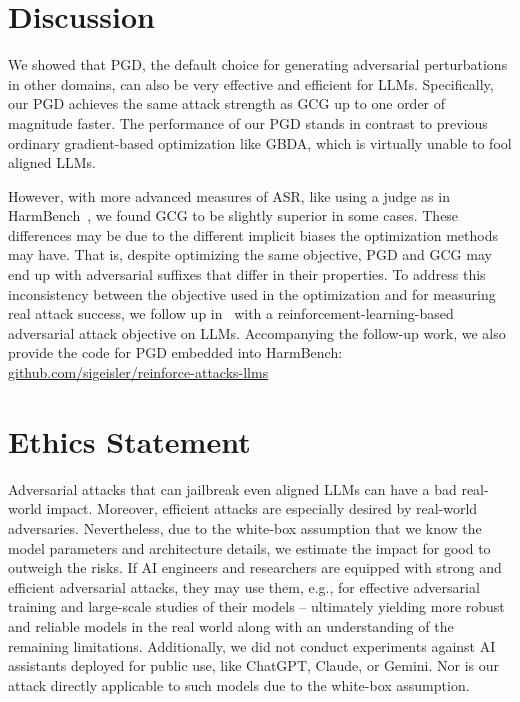 \documentclass{article}
\theoremstyle{plain}
\theoremstyle{definition}
\theoremstyle{remark}
\begin{document}
\section{Discussion}

We showed that PGD, the default choice for generating adversarial perturbations in other domains, can also be very effective and efficient for LLMs. Specifically, our PGD achieves the same attack strength as GCG up to one order of magnitude faster. The performance of our PGD stands in contrast to previous ordinary gradient-based optimization like GBDA, which is virtually unable to fool aligned LLMs. %

However, with more advanced measures of ASR, like using a judge as in HarmBench~\citep{mazeika_harmbench_2024}, we found GCG to be slightly superior in some cases. These differences may be due to the different implicit biases the optimization methods may have. That is, despite optimizing the same objective, PGD and GCG may end up with adversarial suffixes that differ in their properties. To address this inconsistency between the objective used in the optimization and for measuring real attack success, we follow up in~\cite {geisler_reinforce_2025} with a reinforcement-learning-based adversarial attack objective on LLMs. Accompanying the follow-up work, we also provide the code for PGD embedded into HarmBench: \href{https://github.com/sigeisler/reinforce-attacks-llms}{github.com/sigeisler/reinforce-attacks-llms}

\section{Ethics Statement}\label{sec:appendix_ethics}

Adversarial attacks that can jailbreak even aligned LLMs can have a bad real-world impact. Moreover, efficient attacks are especially desired by real-world adversaries. Nevertheless, due to the white-box assumption that we know the model parameters and architecture details, we estimate the impact for good to outweigh the risks. If AI engineers and researchers are equipped with strong and efficient adversarial attacks, they may use them, e.g., for effective adversarial training and large-scale studies of their models -- ultimately yielding more robust and reliable models in the real world along with an understanding of the remaining limitations. Additionally, we did not conduct experiments against AI assistants deployed for public use, like ChatGPT, Claude, or Gemini. Nor is our attack directly applicable to such models due to the white-box assumption.
\end{document}
